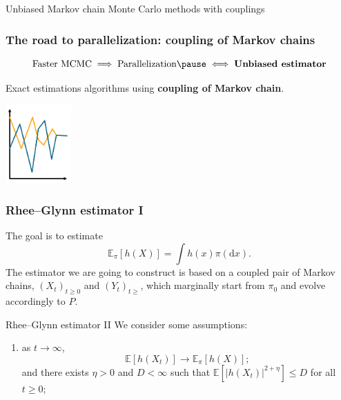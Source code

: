 \documentclass{beamer}
\begin{document}
\begin{section}{Unbiased Markov chain Monte Carlo methods with couplings}
	\begin{frame}[plain]{}
		\sectionpage
	\end{frame}

	\begin{frame}
	 	\frametitle{The road to parallelization: coupling of Markov chains}
	 	
	 	$$ \text{Faster MCMC} \implies \text{Parallelization} \pause \iff \text{\textbf{Unbiased estimator}}
	 	$$

		\pause
		\vspace{0.8 cm }
		\begin{minipage}{0.10\textwidth}

		\end{minipage}
		\hfill
		\begin{minipage}{0.45\textwidth}
			Exact estimations algorithms using \textbf{coupling of Markov chain}.
		\end{minipage}
		\hfill
		\begin{minipage}{0.40\textwidth}
			\begin{center}
				\includegraphics[height=3cm]{img/markov_coupled}
			\end{center}
		\end{minipage}
		
	\end{frame}

	\begin{frame}
	 	\frametitle{Rhee--Glynn estimator I}
	 	The goal is to estimate
	 	$$
	 	\mathbb{E}_{\pi}[h(X)] 
	 	= \int h(x) \pi (\text{d}x)
	 	.
	 	$$
	 	The estimator we are going to construct is based on a coupled pair of Markov chains, $(X_t)_{t\geq 0}$ and $(Y_t)_{t\geq}$, which marginally start from $\pi_0$ and evolve accordingly to $P$.\\ 
	\end{frame}
	
	\begin{frame}{Rhee--Glynn estimator II}
	 	We consider some assumptions:
	 	\begin{enumerate}
	 		\item as $t \to \infty$, 
	 		$$ \mathbb E [h(X_t)] \to \mathbb E_\pi [h(X)];$$
	 		and there exists $\eta > 0$ and $D < \infty$ such that $\mathbb E [|h(X_t)|^{2 + \eta}] \leq D$ for all $t \geq 0$;
	 		

\end{enumerate}
\end{frame}
\end{section}
\end{document}
